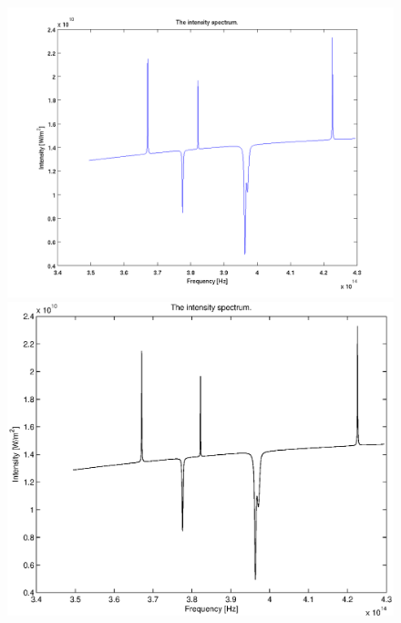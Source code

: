 \documentclass[10pt, a4paper]{article}
\begin{document}
\begin{figure}[hbt]
\begin{center}
\ifpdf
	\includegraphics[width=\linewidth]{../img/spectrum.png}
\else
	\includegraphics[width=\linewidth]{../img/spectrum.eps}
\fi
\end{center}
\caption{}
\label{fig+spec}
\end{figure}
\end{document}
